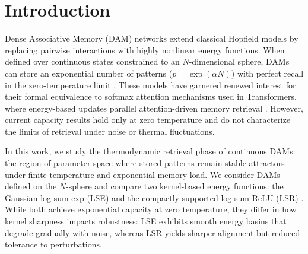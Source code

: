 \documentclass{article}
\theoremstyle{plain}
\theoremstyle{definition}
\theoremstyle{remark}
\begin{document}
\printAffiliationsAndNotice{}  %

\begin{abstract}
We derive thermodynamic phase boundaries for Dense Associative Memory networks with exponential capacity $p = e^{\alpha N}$, comparing Gaussian (LSE) and Epanechnikov (LSR) kernels. For continuous neurons on an $N$-sphere, the geometric entropy depends solely on the spherical geometry, not the kernel. Sufficiently sharp kernels achieve maximum theoretical capacity $\alpha = 0.5$ at zero temperature; below this threshold, a critical line separates retrieval from a spin-glass phase. Kernel sharpness introduces a trade-off between energetic stability and entropic cost: while LSR provides deeper energy minima, it exhibits a smaller retrieval region than LSE at finite temperature because enforcing higher alignment incurs a geometric entropy penalty that outweighs the energetic gain. The kernels also differ qualitatively in their thermal limits: LSR possesses a finite maximum retrieval temperature, whereas LSE permits retrieval at arbitrarily high temperatures for sufficiently low loads.
\end{abstract}

\section{Introduction}

Dense Associative Memory (DAM) networks extend classical Hopfield models by replacing pairwise interactions with highly nonlinear energy functions. When defined over continuous states constrained to an $N$-dimensional sphere, DAMs can store an exponential number of patterns ($p = \exp(\alpha N)$) with perfect recall in the zero-temperature limit \citep{demircigil2017model,ramsauer2021hopfield,lucibello2024exponential}. These models have garnered renewed interest for their formal equivalence to softmax attention mechanisms used in Transformers, where energy-based updates parallel attention-driven memory retrieval \citep{ramsauer2021hopfield}. However, current capacity results hold only at zero temperature and do not characterize the limits of retrieval under noise or thermal fluctuations.

In this work, we study the thermodynamic retrieval phase of continuous DAMs: the region of parameter space where stored patterns remain stable attractors under finite temperature and exponential memory load. We consider DAMs defined on the $N$-sphere and compare two kernel-based energy functions: the Gaussian log-sum-exp (LSE) and the compactly supported log-sum-ReLU (LSR) \citep{hoover2025dense}. While both achieve exponential capacity at zero temperature, they differ in how kernel sharpness impacts robustness: LSE exhibits smooth energy basins that degrade gradually with noise, whereas LSR yields sharper alignment but reduced tolerance to perturbations.
\end{document}
